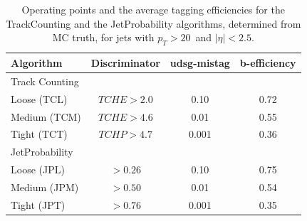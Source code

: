 \begin{table} [htbp]
\begin{center}
\begin{tabular}{|l|c|c|c|} 
\hline
Algorithm         & Discriminator & udsg-mistag & b-efficiency\\ \hline
Track Counting    &               &             &              \\
Loose  (TCL)      &  $TCHE>2.0$   &   0.10      & 0.72  \\ 
Medium (TCM)      &  $TCHE>4.6$   &   0.01      & 0.55 \\ 
Tight  (TCT)      &  $TCHP>4.7$   &   0.001     & 0.36 \\ \hline
JetProbability    &               &             &     \\
Loose  (JPL)      &  $ >0.26  $   &   0.10      & 0.75  \\
Medium (JPM)      &  $ >0.50  $   &   0.01      & 0.54 \\
Tight  (JPT)      &  $ >0.76  $   &   0.001     & 0.35 \\\hline

\hline
\end{tabular}
\caption{\label{tab:OperatingPoints} 
 Operating points and the average tagging efficiencies for the TrackCounting and the JetProbability 
algorithms, determined  from MC truth, for jets with $p_T>20$~\gevc and $|\eta|<2.5$.}
 \end{center}
\end{table}

\clearpage
